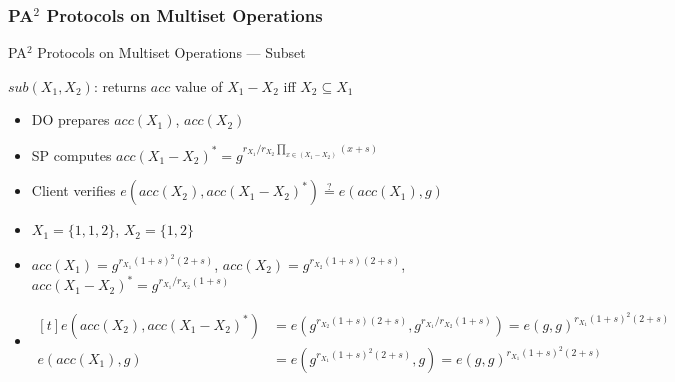 \documentclass[xcolor={dvipsnames},aspectratio=169,10pt]{beamer}
\begin{document}
\subsubsection{PA$^2$ Protocols on Multiset Operations}

\begin{frame}{PA$^2$ Protocols on Multiset Operations --- Subset}
  \begin{block}{$sub(X_1, X_2)$: returns $acc$ value of $X_1 - X_2$ iff $X_2 \subseteq X_1$}
    \begin{itemize}
      \item DO prepares $acc(X_1)$, $acc(X_2)$
      \item SP computes ${acc(X_1 - X_2)}^* = g^{r_{X_1}/r_{X_2} \prod_{x \in (X_1 - X_2)} (x+s)}$
      \item Client verifies $e(acc(X_2), {acc(X_1 - X_2)}^*) \stackrel{?}{=} e(acc(X_1), g)$
    \end{itemize}
  \end{block}
  \begin{example}
    \begin{itemize}
      \item $X_1 = \{ 1, 1, 2 \}$, $X_2 = \{ 1, 2 \}$
      \item $acc(X_1) = g^{r_{X_1}{(1+s)}^2(2+s)}$, $acc(X_2) = g^{r_{X_2}(1+s)(2+s)}$, ${acc(X_1 - X_2)}^* = g^{r_{X_1}/r_{X_2}(1+s)}$
      \item \(
        \begin{aligned}[t]
          e(acc(X_2), {acc(X_1 - X_2)}^*) &= e(g^{r_{X_2}(1+s)(2+s)},g^{r_{X_1}/r_{X_2}(1+s)}) = {e(g, g)}^{r_{X_1}{(1+s)}^2(2+s)} \\
          e(acc(X_1), g) &=  e(g^{r_{X_1}{(1+s)}^2(2+s)}, g) = {e(g, g)}^{r_{X_1}{(1+s)}^2(2+s)}
        \end{aligned}
        \)
    \end{itemize}
  \end{example}
\end{frame}
\end{document}
